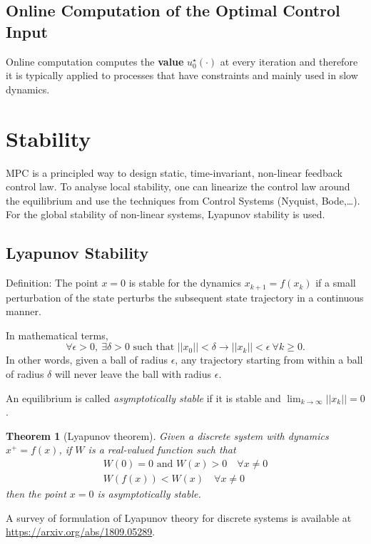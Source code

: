 \documentclass[11pt]{report}
\newtheorem{theorem}{Theorem}
\begin{document}
\subsection{Online Computation of the Optimal Control Input}
\label{sec:online-computation-MPC}

Online computation computes the \textbf{value} $u_0^\star(\cdot)$ at every iteration and therefore it is typically applied to processes that have constraints and mainly used in slow dynamics.

\section{Stability}
\label{sec:mpc-stability}

MPC is a principled way to design static, time-invariant, non-linear feedback control law. To analyse local stability, one can linearize the control law around the equilibrium and use the techniques from Control Systems (Nyquist, Bode,\ldots). For the global stability of non-linear systems, Lyapunov stability is used.

\subsection{Lyapunov Stability}
\label{sec:lyapunov-stability}

Definition: The point $x=0$ is stable for the dynamics $x_{k+1} = f(x_k)$ if a small perturbation of the state perturbs the subsequent state trajectory in a continuous manner.

In mathematical terms,
\begin{equation}
  \label{eq:lyapunov-stability-stable-equilibrium}
  \forall \epsilon > 0,\ \exists \delta > 0 \text{ such that } ||x_0|| < \delta \rightarrow ||x_k|| < \epsilon\ \forall k \ge 0.
\end{equation}
In other words, given a ball of radius $\epsilon$, any trajectory starting from within a ball of radius $\delta$ will never leave the ball with radius $\epsilon$.

An equilibrium is called \emph{asymptotically stable} if it is stable and $\lim_{k\rightarrow \infty} ||x_k||=0$.

\begin{theorem}[Lyapunov theorem]
  Given a discrete system with dynamics $x^+ = f(x)$, if $W$ is a real-valued function such that
  \begin{align*}
    W(0)=0\text{ and }W(x)>0\quad \forall x\neq 0 \\
    W(f(x)) < W(x)\quad \forall x\neq 0
  \end{align*}
  then the point $x=0$ is asymptotically stable.
\end{theorem}
A survey of formulation of Lyapunov theory for discrete systems is available at \url{https://arxiv.org/abs/1809.05289}.
\end{document}
